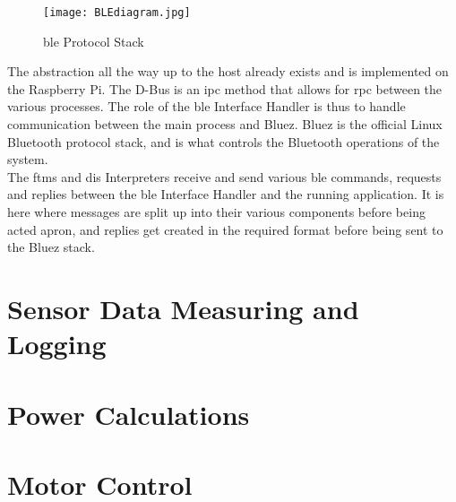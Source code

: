 \begin{figure}[H]
	\begin{center}
		\texttt{[image: BLEdiagram.jpg]}
		\caption{\ac{ble} Protocol Stack}
		\label{fig:blez}
	\end{center}
\end{figure}

The abstraction all the way up to the host already exists and is implemented on the Raspberry Pi. The D-Bus is an \ac{ipc} method that allows for \ac{rpc} between the various processes. The role of the \ac{ble} Interface Handler is thus to handle communication between the main process and Bluez. Bluez is the official Linux Bluetooth protocol stack, and is what controls the Bluetooth operations of the system. \citep{Lee:2020}\\

The \ac{ftms} and \ac{dis} Interpreters receive and send various \ac{ble} commands, requests and replies between the \ac{ble} Interface Handler and the running application. It is here where messages are split up into their various components before being acted apron, and replies get created in the required format before being sent to the Bluez stack.

\newpage

\section{Sensor Data Measuring and Logging}

\newpage

\section{Power Calculations}

\newpage

\section{Motor Control}

